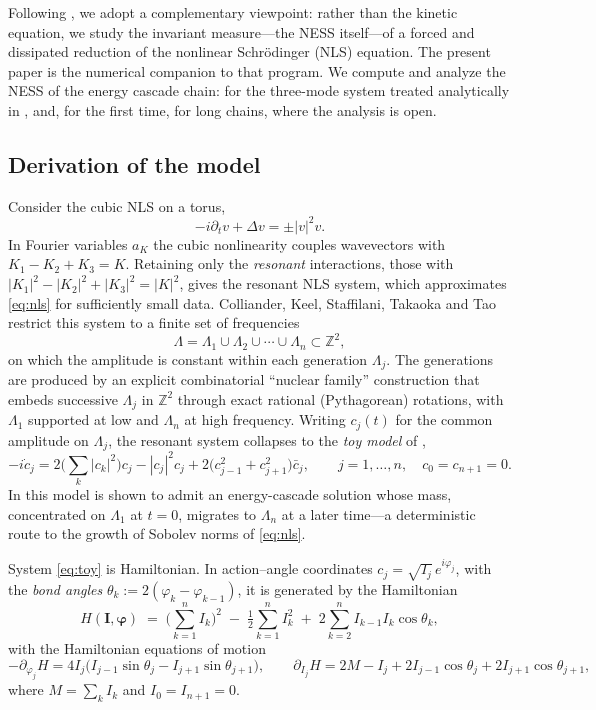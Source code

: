 \documentclass[11pt,a4paper]{article}
\theoremstyle{definition}
\numberwithin{equation}{section}   %
\newcommand{\bI}{\mathbf{I}}
\newcommand{\bphi}{\boldsymbol{\varphi}}
\begin{document}
Following \cite{HLNS}, we adopt a complementary viewpoint: rather than the
kinetic equation, we study the invariant measure---the NESS itself---of a
forced and dissipated reduction of the nonlinear Schr\"odinger (NLS) equation.
The present paper is the numerical companion to that program. We compute and
analyze the NESS of the energy cascade chain: for the three-mode system treated
analytically in \cite{HLNS}, and, for the first time, for long chains, where the
analysis is open.

\subsection{Derivation of the model}\label{sec:derivation}

Consider the cubic NLS on a torus,
\begin{equation}\label{eq:nls}
  -i\partial_t v + \Delta v = \pm |v|^2 v .
\end{equation}
In Fourier variables $a_K$ the cubic nonlinearity couples wavevectors with
$K_1-K_2+K_3=K$. Retaining only the \emph{resonant} interactions, those with
$|K_1|^2-|K_2|^2+|K_3|^2=|K|^2$, gives the resonant NLS system, which
approximates \eqref{eq:nls} for sufficiently small data. Colliander, Keel,
Staffilani, Takaoka and Tao \cite{CKSTT} restrict this system to a finite set of
frequencies
\[
  \Lambda=\Lambda_1\cup\Lambda_2\cup\cdots\cup\Lambda_n\subset\mathbb{Z}^2,
\]
on which the amplitude is constant within each generation $\Lambda_j$. The
generations are produced by an explicit combinatorial ``nuclear family''
construction that embeds successive $\Lambda_j$ in $\mathbb{Z}^2$ through exact
rational (Pythagorean) rotations, with $\Lambda_1$ supported at low and
$\Lambda_n$ at high frequency. Writing $c_j(t)$ for the common amplitude on
$\Lambda_j$, the resonant system collapses to the \emph{toy model} of
\cite{CKSTT},
\begin{equation}\label{eq:toy}
  -i\dot c_j = 2\Big(\sum_k |c_k|^2\Big)c_j - |c_j|^2 c_j
  + 2\big(c_{j-1}^2 + c_{j+1}^2\big)\bar c_j,
  \qquad j=1,\dots,n,\quad c_0=c_{n+1}=0 .
\end{equation}
In \cite{CKSTT} this model is shown to admit an energy-cascade solution whose
mass, concentrated on $\Lambda_1$ at $t=0$, migrates to $\Lambda_n$ at a later
time---a deterministic route to the growth of Sobolev norms of \eqref{eq:nls}.

System \eqref{eq:toy} is Hamiltonian. In action--angle coordinates
$c_j=\sqrt{I_j}\,e^{i\varphi_j}$, with the \emph{bond angles}
$\theta_k:=2(\varphi_k-\varphi_{k-1})$, it is generated by the Hamiltonian
\begin{equation}\label{eq:hamiltonian}
  H(\bI,\bphi) \;=\; \Big(\sum_{k=1}^{n} I_k\Big)^{2}
  \;-\;\tfrac12\sum_{k=1}^{n} I_k^{2}
  \;+\; 2\sum_{k=2}^{n} I_{k-1} I_k \cos\theta_k ,
\end{equation}
with the Hamiltonian equations of motion
\begin{equation}\label{eq:ham-flow}
  -\partial_{\varphi_j}H = 4 I_j\big(I_{j-1}\sin\theta_j - I_{j+1}\sin\theta_{j+1}\big),
  \qquad
  \partial_{I_j}H = 2M - I_j + 2 I_{j-1}\cos\theta_j + 2 I_{j+1}\cos\theta_{j+1},
\end{equation}
where $M=\sum_k I_k$ and $I_0=I_{n+1}=0$.
\end{document}
